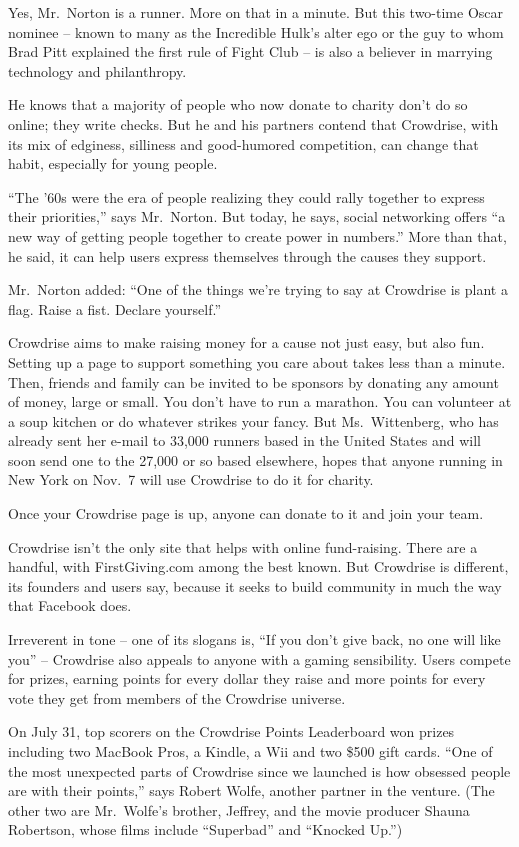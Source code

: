 ﻿\documentclass[12pt]{article}
\begin{document}
Yes, Mr.~Norton is a runner. More on that in a minute. But this two-time Oscar nominee -- known to
many as the Incredible Hulk's alter ego or the guy to whom Brad Pitt explained the first rule of
Fight Club -- is also a believer in marrying technology and philanthropy.

He knows that a majority of people who now donate to charity don't do so online; they write checks.
But he and his partners contend that Crowdrise, with its mix of edginess, silliness and good-humored
competition, can change that habit, especially for young people.

``The '60s were the era of people realizing they could rally together to express their priorities,''
says Mr.~Norton. But today, he says, social networking offers ``a new way of getting people together
to create power in numbers.'' More than that, he said, it can help users express themselves through
the causes they support.

Mr.~Norton added: ``One of the things we're trying to say at Crowdrise is plant a flag. Raise a
fist. Declare yourself.''

Crowdrise aims to make raising money for a cause not just easy, but also fun. Setting up a page to
support something you care about takes less than a minute. Then, friends and family can be invited
to be sponsors by donating any amount of money, large or small. You don't have to run a marathon.
You can volunteer at a soup kitchen or do whatever strikes your fancy. But Ms.~Wittenberg, who has
already sent her e-mail to 33,000 runners based in the United States and will soon send one to the
27,000 or so based elsewhere, hopes that anyone running in New York on Nov.~7 will use Crowdrise to
do it for charity.

Once your Crowdrise page is up, anyone can donate to it and join your team.

Crowdrise isn't the only site that helps with online fund-raising. There are a handful, with
FirstGiving.com among the best known. But Crowdrise is different, its founders and users say,
because it seeks to build community in much the way that Facebook does.

Irreverent in tone -- one of its slogans is, ``If you don't give back, no one will like you'' --
Crowdrise also appeals to anyone with a gaming sensibility. Users compete for prizes, earning points
for every dollar they raise and more points for every vote they get from members of the Crowdrise
universe.

On July 31, top scorers on the Crowdrise Points Leaderboard won prizes including two MacBook Pros, a
Kindle, a Wii and two \$500 gift cards. ``One of the most unexpected parts of Crowdrise since we
launched is how obsessed people are with their points,'' says Robert Wolfe, another partner in the
venture. (The other two are Mr.~Wolfe's brother, Jeffrey, and the movie producer Shauna Robertson,
whose films include ``Superbad'' and ``Knocked Up.'')
\end{document}
